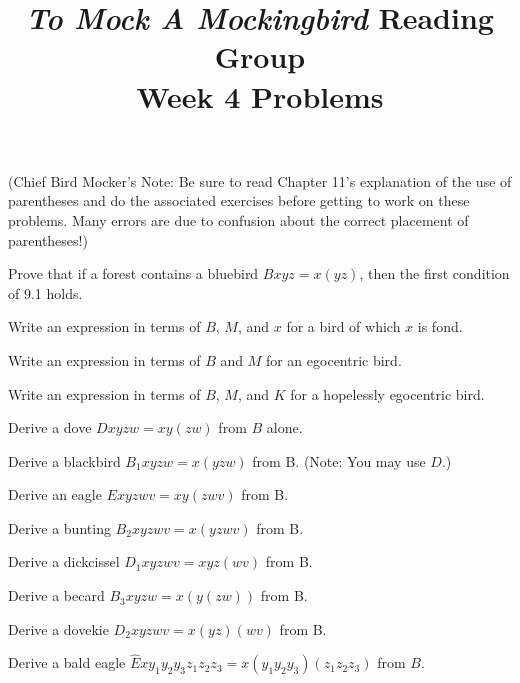 \documentclass[12pt, letterpaper]{article}
\title{\emph{To Mock A Mockingbird} Reading Group\\Week 4 Problems}
\begin{document}
\maketitle

\noindent (Chief Bird Mocker's Note: Be sure to read Chapter 11's explanation of the use of parentheses and do the associated exercises before getting to work on these problems. Many errors are due to confusion about the correct placement of parentheses!)

\begin{prob}{11.1}
Prove that if a forest contains a bluebird $Bxyz = x(yz)$, then the first condition of 9.1 holds.
\end{prob}

\begin{prob}{11.2}
Write an expression in terms of $B$, $M$, and $x$ for a bird of which $x$ is fond.
\end{prob}

\begin{prob}{11.3}
Write an expression in terms of $B$ and $M$ for an egocentric bird.
\end{prob}

\begin{prob}{11.4}
Write an expression in terms of $B$, $M$, and $K$ for a hopelessly egocentric bird.
\end{prob}

\begin{prob}{11.5}
Derive a dove $Dxyzw = xy(zw)$ from $B$ alone.
\end{prob}

\begin{prob}{11.6}
Derive a blackbird $B_1xyzw = x(yzw)$ from B. (Note: You may use $D$.)
\end{prob}

\begin{prob}{11.7}
Derive an eagle $Exyzwv = xy(zwv)$ from B.
\end{prob}

\begin{prob}{11.8}
Derive a bunting $B_2xyzwv = x(yzwv)$ from B.
\end{prob}

\begin{prob}{11.9}
Derive a dickcissel $D_1xyzwv = xyz(wv)$ from B.
\end{prob}

\begin{prob}{11.10}
Derive a becard $B_3xyzw = x(y(zw))$ from B.
\end{prob}

\begin{prob}{11.11}
Derive a dovekie $D_2xyzwv = x(yz)(wv)$ from B.
\end{prob}

\begin{prob}{11.12}
Derive a bald eagle $\hat{E}xy_1y_2y_3z_1z_2z_3 = x(y_1y_2y_3)(z_1z_2z_3)$ from  $B$.
\end{prob}
\end{document}
